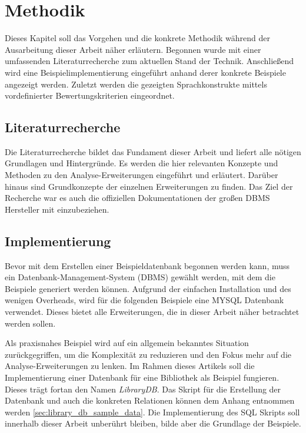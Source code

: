 \chapter{Methodik}
\label{chap:methodik} Dieses Kapitel soll das Vorgehen und die konkrete Methodik
während der Ausarbeitung dieser Arbeit näher erläutern. Begonnen wurde mit einer
umfassenden Literaturrecherche zum aktuellen Stand der Technik. Anschließend wird
eine Beispielimplementierung eingeführt anhand derer konkrete Beispiele angezeigt
werden. Zuletzt werden die gezeigten Sprachkonstrukte mittels vordefinierter
Bewertungskriterien eingeordnet.

\section{Literaturrecherche}
\label{sec:literaturrecherche} Die Literaturrecherche bildet das Fundament
dieser Arbeit und liefert alle nötigen Grundlagen und Hintergründe. Es werden die
hier relevanten Konzepte und Methoden zu den Analyse-Erweiterungen eingeführt und
erläutert. Darüber hinaus sind Grundkonzepte der einzelnen Erweiterungen zu
finden. Das Ziel der Recherche war es auch die offiziellen Dokumentationen der großen
DBMS Hersteller mit einzubeziehen.

\section{Implementierung}
\label{sec:implementierung} Bevor mit dem Erstellen einer Beispieldatenbank begonnen
werden kann, muss ein Datenbank-Management-System (DBMS) gewählt werden, mit dem
die Beispiele generiert werden können. Aufgrund der einfachen Installation und
des wenigen Overheads, wird für die folgenden Beispiele eine MYSQL Datenbank verwendet.
Dieses bietet alle Erweiterungen, die in dieser Arbeit näher betrachtet werden sollen.

Als praxisnahes Beispiel wird auf ein allgemein bekanntes Situation zurückgegriffen,
um die Komplexität zu reduzieren und den Fokus mehr auf die Analyse-Erweiterungen
zu lenken. Im Rahmen dieses Artikels soll die Implementierung einer Datenbank für
eine Bibliothek als Beispiel fungieren. Dieses trägt fortan den Namen \textit{LibraryDB}.
Das Skript für die Erstellung der Datenbank und auch die konkreten Relationen
können dem Anhang entnommen werden \ref{sec:library_db_sample_data}. Die Implementierung des SQL Skripts soll innerhalb
dieser Arbeit unberührt bleiben, bilde aber die Grundlage der Beispiele.

